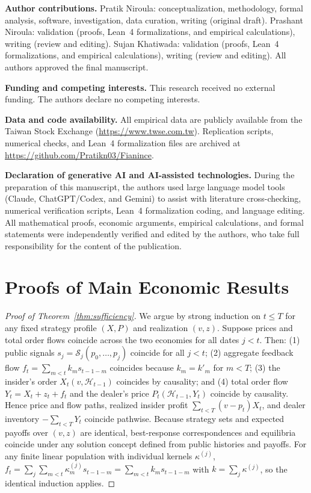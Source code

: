 \documentclass[11pt,letterpaper]{article}
\theoremstyle{definition}
\begin{document}
\textbf{Author contributions.} Pratik Niroula: conceptualization, methodology, formal analysis, software, investigation, data curation, writing (original draft). Prashant Niroula: validation (proofs, Lean~4 formalizations, and empirical calculations), writing (review and editing). Sujan Khatiwada: validation (proofs, Lean~4 formalizations, and empirical calculations), writing (review and editing). All authors approved the final manuscript.

\textbf{Funding and competing interests.} This research received no external funding. The authors declare no competing interests.

\textbf{Data and code availability.} All empirical data are publicly available from the Taiwan Stock Exchange (\url{https://www.twse.com.tw}). Replication scripts, numerical checks, and Lean~4 formalization files are archived at \url{https://github.com/Pratikn03/Fianince}.

\textbf{Declaration of generative AI and AI-assisted technologies.} During the preparation of this manuscript, the authors used large language model tools (Claude, ChatGPT/Codex, and Gemini) to assist with literature cross-checking, numerical verification scripts, Lean~4 formalization coding, and language editing. All mathematical proofs, economic arguments, empirical calculations, and formal statements were independently verified and edited by the authors, who take full responsibility for the content of the publication.

\appendix
\section{Proofs of Main Economic Results}\label{app:proofs}

\begin{proof}[Proof of Theorem~\ref{thm:sufficiency}]
We argue by strong induction on $t \le T$ for any fixed strategy profile $(X, P)$ and realization $(v, z)$. Suppose prices and total order flows coincide across the two economies for all dates $j < t$. Then: (1) public signals $s_j = \mathcal{S}_j(p_0, \dots, p_j)$ coincide for all $j < t$; (2) aggregate feedback flow $f_t = \sum_{m < t} k_m s_{t-1-m}$ coincides because $k_m = k'_m$ for $m < T$; (3) the insider's order $X_t(v, \mathcal{H}_{t-1})$ coincides by causality; and (4) total order flow $Y_t = X_t + z_t + f_t$ and the dealer's price $P_t(\mathcal{H}_{t-1}, Y_t)$ coincide by causality. Hence price and flow paths, realized insider profit $\sum_{t < T}(v - p_t) X_t$, and dealer inventory $-\sum_{t < T} Y_t$ coincide pathwise. Because strategy sets and expected payoffs over $(v, z)$ are identical, best-response correspondences and equilibria coincide under any solution concept defined from public histories and payoffs. For any finite linear population with individual kernels $\kappa^{(j)}$, $f_t = \sum_j \sum_{m < t} \kappa_m^{(j)} s_{t-1-m} = \sum_{m < t} k_m s_{t-1-m}$ with $k = \sum_j \kappa^{(j)}$, so the identical induction applies.
\end{proof}
\end{document}
